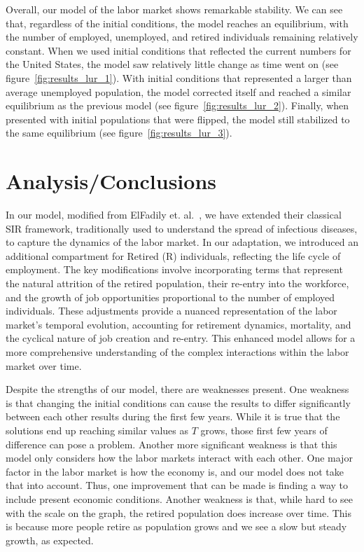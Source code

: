 \documentclass[11pt]{amsart}
\begin{document}
Overall, our model of the labor market shows remarkable stability. 
We can see that, regardless of the initial conditions, the model reaches an equilibrium, 
with the number of employed, unemployed, and retired individuals remaining relatively constant.
When we used initial conditions that reflected the current numbers for the United States,
the model saw relatively little change as time went on (see figure~\ref{fig:results_lur_1}).
With initial conditions that represented a larger than average unemployed population, the model corrected itself and reached a
similar equilibrium as the previous model (see figure~\ref{fig:results_lur_2}).
Finally, when presented with initial populations that were flipped, the model still stabilized to the same equilibrium
(see figure~\ref{fig:results_lur_3}).

\section{Analysis/Conclusions}

In our model, modified from ElFadily et. al.~\cite{ElFadily}, we have extended their classical SIR framework, traditionally 
used to understand the spread of infectious diseases, to capture the dynamics of the labor market. In our adaptation, 
we introduced an additional compartment for Retired (R) individuals, reflecting the life cycle of employment. The key 
modifications involve incorporating terms that represent the natural attrition of the retired population, their re-entry into 
the workforce, and the growth of job opportunities proportional to the number of employed individuals. These adjustments provide 
a nuanced representation of the labor market's temporal evolution, accounting for retirement dynamics, mortality, and the cyclical 
nature of job creation and re-entry. This enhanced model allows for a more comprehensive understanding of the complex interactions 
within the labor market over time.

Despite the strengths of our model, there are weaknesses present. One weakness is that changing the initial conditions can cause 
the results to differ significantly between each other results during the first few years. While it is true that the solutions 
end up reaching similar values as $T$ grows, those first few years of difference can pose a problem. Another more significant 
weakness is that this model only considers how the labor markets interact with each other. One major factor in the labor market 
is how the economy is, and our model does not take that into account. Thus, one improvement that can be made is finding a way to 
include present economic conditions. Another weakness is that, while hard to see with the scale on the graph, the retired population 
does increase over time. This is because more people retire as population grows and we see a slow but steady growth, as expected.
\end{document}
